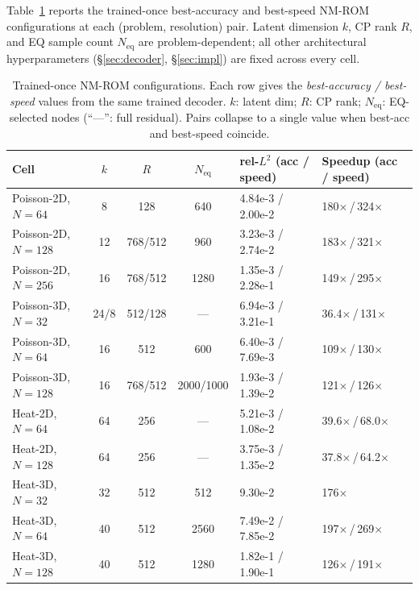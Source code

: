 \documentclass{article}
\begin{document}
  Table~\ref{tab:best} reports the trained-once best-accuracy and                                          
  best-speed NM-ROM configurations at each (problem, resolution) pair.                                     
  Latent dimension $k$, CP rank $R$, and EQ sample count $N_\mathrm{eq}$                                   
  are problem-dependent; all other architectural hyperparameters
  (\S\ref{sec:decoder}, \S\ref{sec:impl}) are fixed across every
  cell.                                                                                                    
                                                                                                           
  \begin{table}[!htbp]
  \centering
  \caption{Trained-once NM-ROM configurations. Each row gives the
  \emph{best-accuracy / best-speed} values from the same trained
  decoder. $k$: latent dim; $R$: CP rank; $N_\mathrm{eq}$: EQ-selected
  nodes (``---'': full residual). Pairs collapse to a single value
  when best-acc and best-speed coincide.}
  \label{tab:best}
  \setlength{\tabcolsep}{5pt}
  \small
  \begin{tabular}{lcccll}
  \toprule
  Cell & $k$ & $R$ & $N_\mathrm{eq}$ & rel-$L^2$ (acc / speed) & Speedup (acc / speed) \\
  \midrule
  Poisson-2D, $N{=}64$  & 8  & 128 & 640  & 4.84e-3 / 2.00e-2 & 180$\times$\,/\,324$\times$ \\
  Poisson-2D, $N{=}128$ & 12 & 768/512 & 960  & 3.23e-3 / 2.74e-2 & 183$\times$\,/\,321$\times$ \\
  Poisson-2D, $N{=}256$ & 16 & 768/512 & 1280 & 1.35e-3 / 2.28e-1 & 149$\times$\,/\,295$\times$ \\
  Poisson-3D, $N{=}32$  & 24/8 & 512/128 & --- & 6.94e-3 / 3.21e-1 & 36.4$\times$\,/\,131$\times$ \\
  Poisson-3D, $N{=}64$  & 16 & 512 & 600  & 6.40e-3 / 7.69e-3 & 109$\times$\,/\,130$\times$ \\
  Poisson-3D, $N{=}128$ & 16 & 768/512 & 2000/1000 & 1.93e-3 / 1.39e-2 & 121$\times$\,/\,126$\times$ \\
  Heat-2D, $N{=}64$     & 64 & 256 & --- & 5.21e-3 / 1.08e-2 & 39.6$\times$\,/\,68.0$\times$ \\
  Heat-2D, $N{=}128$    & 64 & 256 & --- & 3.75e-3 / 1.35e-2 & 37.8$\times$\,/\,64.2$\times$ \\
  Heat-3D, $N{=}32$     & 32 & 512 & 512 & 9.30e-2           & 176$\times$ \\
  Heat-3D, $N{=}64$     & 40 & 512 & 2560 & 7.49e-2 / 7.85e-2 & 197$\times$\,/\,269$\times$ \\
  Heat-3D, $N{=}128$    & 40 & 512 & 1280 & 1.82e-1 / 1.90e-1 & 126$\times$\,/\,191$\times$ \\
  \bottomrule
  \end{tabular}
  \end{table}                                                                                              
                                                      
\end{document}
